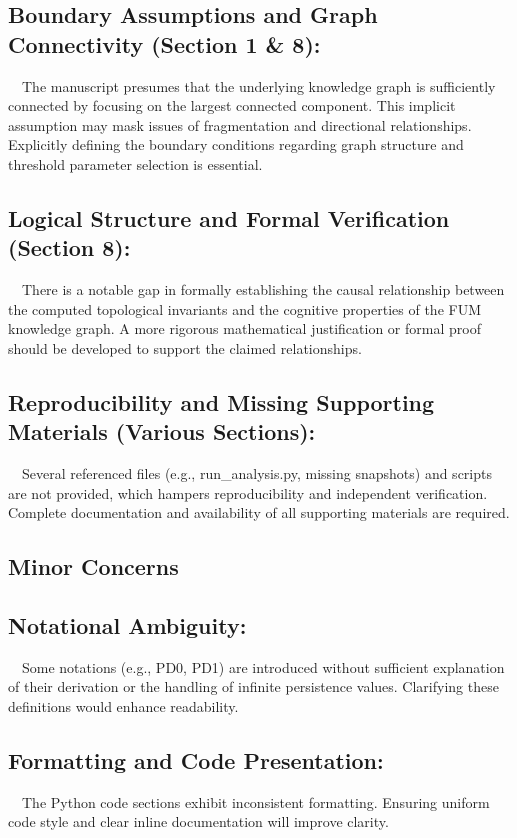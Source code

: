 \documentclass{article}
\begin{document}
\subsection{Boundary Assumptions and Graph Connectivity (Section 1 \& 8):  }
 The manuscript presumes that the underlying knowledge graph is sufficiently connected by focusing on the largest connected component. This implicit assumption may mask issues of fragmentation and directional relationships. Explicitly defining the boundary conditions regarding graph structure and threshold parameter selection is essential.

\subsection{Logical Structure and Formal Verification (Section 8):  }
 There is a notable gap in formally establishing the causal relationship between the computed topological invariants and the cognitive properties of the FUM knowledge graph. A more rigorous mathematical justification or formal proof should be developed to support the claimed relationships.

\subsection{Reproducibility and Missing Supporting Materials (Various Sections):  }
 Several referenced files (e.g., run\_analysis.py, missing snapshots) and scripts are not provided, which hampers reproducibility and independent verification. Complete documentation and availability of all supporting materials are required.

\hrulefill
\subsection{Minor Concerns}

\subsection{Notational Ambiguity:  }
 Some notations (e.g., PD0, PD1) are introduced without sufficient explanation of their derivation or the handling of infinite persistence values. Clarifying these definitions would enhance readability.

\subsection{Formatting and Code Presentation:  }
 The Python code sections exhibit inconsistent formatting. Ensuring uniform code style and clear inline documentation will improve clarity.
\end{document}
